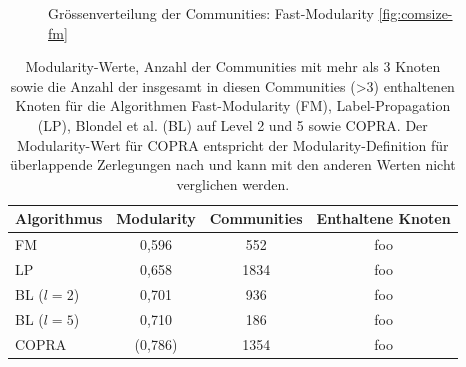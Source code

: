 \begin{figure}[t]
  \caption{Gr\"ossenverteilung der Communities: Fast-Modularity \ref{fig:comsize-fm}}
  \label{fig:comsizedist}
\end{figure}


\begin{table}[h]
  \centering
  \footnotesize
  \begin{tabular}{l|c|c|c}
    Algorithmus & Modularity & Communities &
    Enthaltene Knoten \\
    \hline
    FM & 0,596 & 552 & foo \\
    LP & 0,658 & 1834 & foo \\
    BL ($l=2$)& 0,701 & 936 & foo \\
    BL ($l=5$)& 0,710 & 186 & foo \\
    COPRA & (0,786) & 1354 & foo
  \end{tabular}
  \caption{Modularity-Werte, Anzahl der Communities mit mehr als 3
    Knoten sowie die Anzahl der insgesamt in diesen Communities (>3) enthaltenen
    Knoten 
    f\"ur die Algorithmen Fast-Modularity (FM), Label-Propagation
    (LP), Blondel et al. (BL) auf Level 2 und 5 sowie COPRA. Der
    Modularity-Wert f\"ur COPRA entspricht der Modularity-Definition
    f\"ur \"uberlappende Zerlegungen nach \cite{Nicosia2009} und kann mit den anderen
    Werten nicht verglichen werden.}
  \label{tab:foo}
\end{table}



